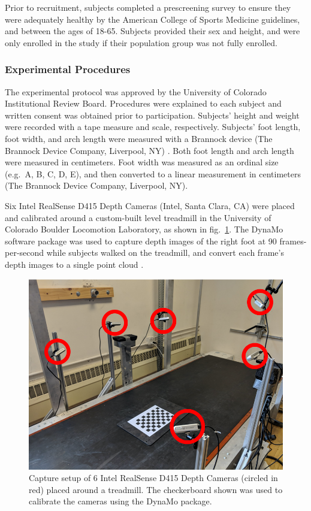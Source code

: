 \documentclass[defaultstyle,11pt]{comps}
\begin{document}
Prior to recruitment, subjects completed a prescreening survey to ensure they were adequately healthy by the American College of Sports Medicine guidelines\citep{Riebe2015}, and between the ages of 18-65.
Subjects provided their sex and height, and were only enrolled in the study if their population group was not fully enrolled.

\hypertarget{experimental-procedures}{%
\subsubsection{Experimental Procedures}\label{experimental-procedures}}

The experimental protocol was approved by the University of Colorado Institutional Review Board.
Procedures were explained to each subject and written consent was obtained prior to participation.
Subjects' height and weight were recorded with a tape measure and scale, respectively.
Subjects' foot length, foot width, and arch length were measured with a Brannock device (The Brannock Device Company, Liverpool, NY) \citep{ASTM2017}.
Both foot length and arch length were measured in centimeters.
Foot width was measured as an ordinal size (e.g.~A, B, C, D, E), and then converted to a linear measurement in centimeters (The Brannock Device Company, Liverpool, NY).

Six Intel RealSense D415 Depth Cameras (Intel, Santa Clara, CA) were placed and calibrated around a custom-built level treadmill in the University of Colorado Boulder Locomotion Laboratory, as shown in fig.~\ref{fig:testSetup}.
The DynaMo software package was used to capture depth images of the right foot at 90 frames-per-second while subjects walked on the treadmill, and convert each frame's depth images to a single point cloud \citep{Boppana2019}.

\begin{figure}
\hypertarget{fig:testSetup}{%
\centering
\includegraphics{../fig/SA2/capturesetup.png}
\caption{Capture setup of 6 Intel RealSense D415 Depth Cameras (circled in red) placed around a treadmill. The checkerboard shown was used to calibrate the cameras using the DynaMo package.}\label{fig:testSetup}
}
\end{figure}
\end{document}
